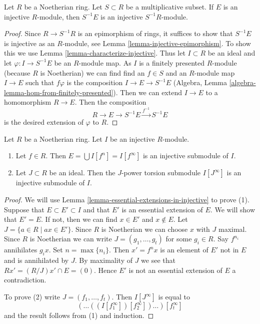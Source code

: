 \begin{lemma}
\label{lemma-localization-injective-modules}
Let $R$ be a Noetherian ring. Let $S \subset R$ be a multiplicative
subset. If $E$ is an injective $R$-module, then $S^{-1}E$ is an
injective $S^{-1}R$-module.
\end{lemma}

\begin{proof}
Since $R \to S^{-1}R$ is an epimorphism of rings, it suffices
to show that $S^{-1}E$ is injective as an $R$-module, see
Lemma \ref{lemma-injective-epimorphism}.
To show this we use Lemma \ref{lemma-characterize-injective}.
Thus let $I \subset R$ be an ideal and let
$\varphi : I \to S^{-1} E$ be an $R$-module map.
As $I$ is a finitely presented $R$-module (because $R$ is Noetherian)
we can find find an $f \in S$ and an $R$-module map $I \to E$
such that $f\varphi$ is the composition $I \to E \to S^{-1}E$
(Algebra, Lemma \ref{algebra-lemma-hom-from-finitely-presented}).
Then we can extend $I \to E$ to a homomorphism $R \to E$.
Then the composition
$$
R \to E \to S^{-1}E \xrightarrow{f^{-1}} S^{-1}E
$$
is the desired extension of $\varphi$ to $R$.
\end{proof}

\begin{lemma}
\label{lemma-injective-module-divide}
Let $R$ be a Noetherian ring. Let $I$ be an injective $R$-module.
\begin{enumerate}
\item Let $f \in R$. Then $E = \bigcup I[f^n] = I[f^\infty]$
is an injective submodule of $I$.
\item Let $J \subset R$ be an ideal. Then the $J$-power torsion
submodule $I[J^\infty]$ is an injective submodule of $I$.
\end{enumerate}
\end{lemma}

\begin{proof}
We will use Lemma \ref{lemma-essential-extensions-in-injective}
to prove (1).
Suppose that $E \subset E' \subset I$ and that $E'$ is an essential
extension of $E$. We will show that $E' = E$. If not, then we can
find $x \in E'$ and $x \not \in E$. Let $J = \{a \in R \mid ax \in E'\}$.
Since $R$ is Noetherian we can choose $x$ with $J$ maximal.
Since $R$ is Noetherian we can write $J = (g_1, \ldots, g_t)$ for some
$g_i \in R$. Say $f^{n_i}$ annihilates $g_ix$. Set $n = \max\{n_i\}$.
Then $x' = f^n x$ is an element of $E'$ not in $E$ and is annihilated
by $J$. By maximality of $J$ we see that $R x' = (R/J)x'  \cap E = (0)$.
Hence $E'$ is not an essential extension of $E$ a contradiction.

\medskip\noindent
To prove (2) write $J = (f_1, \ldots, f_t)$. Then
$I[J^\infty]$ is equal to
$$
(\ldots((I[f_1^\infty])[f_2^\infty])\ldots)[f_t^\infty]
$$
and the result follows from (1) and induction.
\end{proof}

